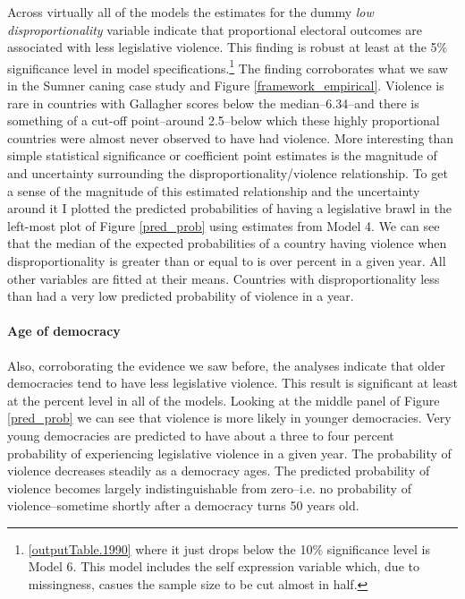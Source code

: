 \documentclass[a4paper]{article}\usepackage[]{graphicx}\usepackage[]{color}
\begin{document}
Across virtually all of the models the estimates for the dummy {\emph{low disproportionality}} variable indicate that proportional electoral outcomes are associated with less legislative violence. This finding is robust at least at the 5\% significance level in  model specifications.\footnote{ \ref{outputTable.1990} {where it just drops below the 10\% significance level is Model 6. This model includes the self expression variable which, due to missingness, casues the sample size to be cut almost in half.}} The finding corroborates what we saw in the Sumner caning case study and Figure \ref{framework_empirical}. Violence is rare in countries with Gallagher scores below the median--6.34--and there is something of a cut-off point--around 2.5--below which these highly proportional countries were almost never observed to have had violence. More interesting than simple statistical significance or coefficient point estimates is the magnitude of and uncertainty surrounding the disproportionality/violence relationship. To get a sense of the magnitude of this estimated relationship and the uncertainty around it I plotted the predicted probabilities of having a legislative brawl in the left-most plot of Figure \ref{pred_prob} using estimates from Model 4. We can see that the median of the expected probabilities of a country having violence when disproportionality is greater than or equal to  is  over  percent in a given year. All other variables are fitted at their means. Countries with disproportionality less than  had a very low predicted probability of violence in a year.

\paragraph{Age of democracy}

Also, corroborating the evidence we saw before, the analyses indicate that older democracies tend to have less legislative violence. This result is significant at least at the  percent level in all of the models. Looking at the middle panel of Figure \ref{pred_prob} we can see that violence is more likely in younger democracies. Very young democracies are predicted to have about a three to four percent probability of experiencing legislative violence in a given year. The probability of violence decreases steadily as a democracy ages. The predicted probability of violence becomes largely indistinguishable from zero--i.e. no probability of violence--sometime shortly after a democracy turns 50 years old.
\end{document}
